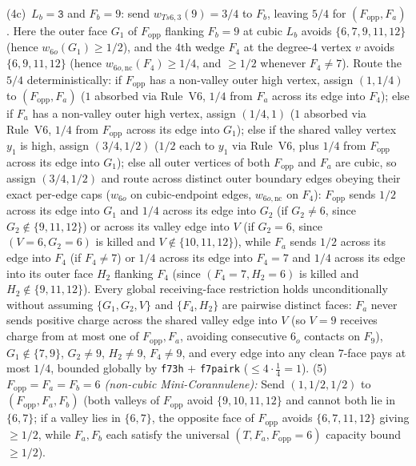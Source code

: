 \documentclass[11pt,reqno]{amsart}
\theoremstyle{plain}
\theoremstyle{definition}
\theoremstyle{remark}
\DeclareRobustCommand{\_}{\ifmmode\text{\textunderscore}\else\textunderscore\allowbreak\fi}
\begin{document}
\begin{itemize}[leftmargin=1.8em]
\begin{enumerate}[label=(\roman*),leftmargin=2.0em]
\begin{itemize}[leftmargin=1.4em]
            (4c)~$L_b = \texttt{3}$ and $F_b = 9$: send $w_{Ts6,3}(9) = 3/4$ to $F_b$, leaving $5/4$ for $(F_{\mathrm{opp}}, F_a)$. Here the outer face $G_1$ of $F_{\mathrm{opp}}$ flanking $F_b = 9$ at cubic $L_b$ avoids $\{6, 7, 9, 11, 12\}$ (hence $w_{6o}(G_1) \ge 1/2$), and the $4$th wedge $F_4$ at the degree-$4$ vertex $v$ avoids $\{6, 9, 11, 12\}$ (hence $w_{6o,\mathrm{nc}}(F_4) \ge 1/4$, and $\ge 1/2$ whenever $F_4 \neq 7$). Route the $5/4$ deterministically: if $F_{\mathrm{opp}}$ has a non-valley outer high vertex, assign $(1, 1/4)$ to $(F_{\mathrm{opp}}, F_a)$ ($1$ absorbed via Rule~V6, $1/4$ from $F_a$ across its edge into $F_4$); else if $F_a$ has a non-valley outer high vertex, assign $(1/4, 1)$ ($1$ absorbed via Rule~V6, $1/4$ from $F_{\mathrm{opp}}$ across its edge into $G_1$); else if the shared valley vertex $y_1$ is high, assign $(3/4, 1/2)$ ($1/2$ each to $y_1$ via Rule~V6, plus $1/4$ from $F_{\mathrm{opp}}$ across its edge into $G_1$); else all outer vertices of both $F_{\mathrm{opp}}$ and $F_a$ are cubic, so assign $(3/4, 1/2)$ and route across distinct outer boundary edges obeying their exact per-edge caps ($w_{6o}$ on cubic-endpoint edges, $w_{6o,\mathrm{nc}}$ on $F_4$): $F_{\mathrm{opp}}$ sends $1/2$ across its edge into $G_1$ and $1/4$ across its edge into $G_2$ (if $G_2 \neq 6$, since $G_2 \notin \{9, 11, 12\}$) or across its valley edge into $V$ (if $G_2 = 6$, since $(V=6, G_2=6)$ is killed and $V \notin \{10, 11, 12\}$), while $F_a$ sends $1/2$ across its edge into $F_4$ (if $F_4 \neq 7$) or $1/4$ across its edge into $F_4 = 7$ and $1/4$ across its edge into its outer face $H_2$ flanking $F_4$ (since $(F_4 = 7, H_2 = 6)$ is killed and $H_2 \notin \{9, 11, 12\}$). Every global receiving-face restriction holds unconditionally without assuming $\{G_1, G_2, V\}$ and $\{F_4, H_2\}$ are pairwise distinct faces: $F_a$ never sends positive charge across the shared valley edge into $V$ (so $V = 9$ receives charge from at most one of $F_{\mathrm{opp}}, F_a$, avoiding consecutive $6_o$ contacts on $F_9$), $G_1 \notin \{7, 9\}$, $G_2 \neq 9$, $H_2 \neq 9$, $F_4 \neq 9$, and every edge into any clean $7$-face pays at most $1/4$, bounded globally by \texttt{f7\_3h} $+$ \texttt{f7\_pair\_k} ($\le 4 \cdot \frac{1}{4} = 1$).
          (5)~\emph{$F_{\mathrm{opp}} = F_a = F_b = 6$ (non-cubic Mini-Corannulene):} Send $(1, 1/2, 1/2)$ to $(F_{\mathrm{opp}}, F_a, F_b)$ (both valleys of $F_{\mathrm{opp}}$ avoid $\{9, 10, 11, 12\}$ and cannot both lie in $\{6, 7\}$; if a valley lies in $\{6, 7\}$, the opposite face of $F_{\mathrm{opp}}$ avoids $\{6, 7, 11, 12\}$ giving $\ge 1/2$, while $F_a, F_b$ each satisfy the universal $(T, F_a, F_{\mathrm{opp}}=6)$ capacity bound $\ge 1/2$).

\end{itemize}
\end{enumerate}
\end{itemize}
\end{document}
